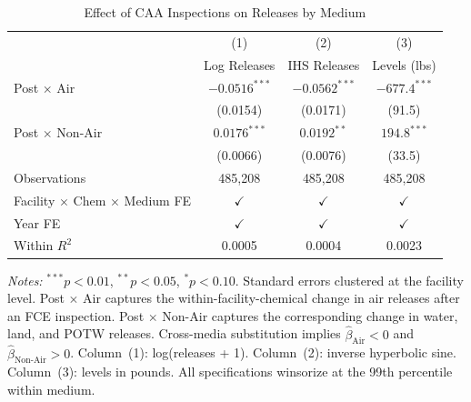 \begin{table}[t]
\centering
\caption{Effect of CAA Inspections on Releases by Medium}
\label{tab:main}
\begin{tabular}{lccc}
\hline\hline
& (1) & (2) & (3) \\
& Log Releases & IHS Releases & Levels (lbs) \\
\hline
Post $\times$ Air & $-0.0516^{***}$ & $-0.0562^{***}$ & $-677.4^{***}$ \\
& (0.0154) & (0.0171) & (91.5) \\[4pt]
Post $\times$ Non-Air & $0.0176^{***}$ & $0.0192^{**}$ & $194.8^{***}$ \\
& (0.0066) & (0.0076) & (33.5) \\
\hline
Observations & 485,208 & 485,208 & 485,208 \\
Facility $\times$ Chem $\times$ Medium FE & $\checkmark$ & $\checkmark$ & $\checkmark$ \\
Year FE & $\checkmark$ & $\checkmark$ & $\checkmark$ \\
Within $R^2$ & 0.0005 & 0.0004 & 0.0023 \\
\hline\hline
\end{tabular}
\vspace{0.3em}
\begin{minipage}{\textwidth}
\footnotesize
\textit{Notes:} $^{***}p<0.01$, $^{**}p<0.05$, $^{*}p<0.10$. Standard errors clustered at the facility level. Post $\times$ Air captures the within-facility-chemical change in air releases after an FCE inspection. Post $\times$ Non-Air captures the corresponding change in water, land, and POTW releases. Cross-media substitution implies $\hat{\beta}_{\text{Air}} < 0$ and $\hat{\beta}_{\text{Non-Air}} > 0$. Column~(1): log(releases + 1). Column~(2): inverse hyperbolic sine. Column~(3): levels in pounds. All specifications winsorize at the 99th percentile within medium.
\end{minipage}
\end{table}
